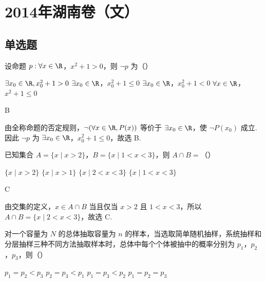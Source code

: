 
\chapter{2014年湖南卷（文）}

\section{单选题}

\begin{problem}
设命题 \(p: \forall x \in \R\)，\(x^2 + 1 > 0\)，则 \(\neg p\) 为（\quad）

\choices
    {\(\exists x_0 \in \R, x_0^2 + 1 > 0\)}
    {\(\exists x_0 \in \R\)，\(x_0^2 + 1 \leqslant 0\)}
    {\(\exists x_0 \in \R\)，\(x_0^2 + 1 < 0\)}
    {\(\forall x \in \R\)，\(x^2 + 1 \leqslant 0\)}
\end{problem}

\begin{answer}
B
\end{answer}

\begin{solution}
由全称命题的否定规则，\(\neg(\forall x\in\R, P(x))\) 等价于 \(\exists x_0\in\R\)，使 \(\neg P(x_0)\) 成立. 因此 \(\neg p\) 为 \(\exists x_0\in\R\)，\(x_0^2+1\leqslant0\)，故选 B.
\end{solution}

\begin{problem}
已知集合 \(A = \{x \mid x > 2\}\)，\(B = \{x \mid 1 < x < 3\}\)，则 \(A \cap B =\)（\quad）

\choices
    {\( \{x \mid x > 2\} \)}
    {\( \{x \mid x > 1\} \)}
    {\(\{x\mid 2 < x < 3\}\)}
    {\(\{x\mid 1 < x < 3\}\)}
\end{problem}

\begin{answer}
C
\end{answer}

\begin{solution}
由交集的定义，\(x\in A\cap B\) 当且仅当 \(x>2\) 且 \(1<x<3\)，所以 \(A\cap B=\{x\mid 2<x<3\}\)，故选 C.
\end{solution}

\begin{problem}
对一个容量为 \(N\) 的总体抽取容量为 \(n\) 的样本，当选取简单随机抽样，系统抽样和分层抽样三种不同方法抽取样本时，总体中每个个体被抽中的概率分别为 \(p_1\)，\(p_2\)，\(p_3\)，则（\quad）

\choices
    {\(p_1 = p_2 < p_3\)}
    {\(p_2 = p_3 < p_1\)}
    {\(p_1 = p_3 < p_2\)}
    {\(p_1 = p_2 = p_3\)}
\end{problem}

